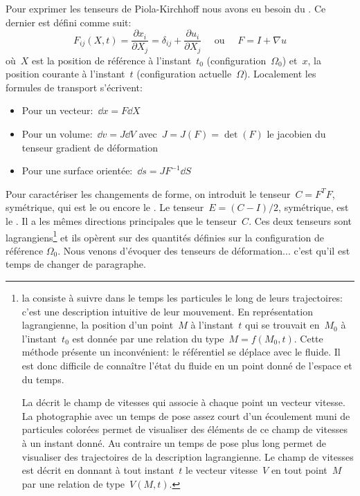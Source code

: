 \medskipvm
Pour exprimer les tenseurs de Piola-Kirchhoff
nous avons eu besoin du . Ce dernier est défini comme suit:
\begin{equation} F_{ij}(X,t) = \dfrac{\partial x_i}{\partial X_j} = \delta_{ij} + \frac{\partial u_i}{\partial X_j}
\quad \text{ ou } \quad F = I + \nabla u\end{equation}
où~$X$ est la position de référence à l'instant~$t_0$ (configuration~$\Omega_0$) et~$x$, la position
courante à l'instant~$t$ (configuration actuelle~$\Omega$).
\medskipvm
Localement les formules de transport s'écrivent:
\begin{itemize}
  \item Pour un vecteur:~$\dd x = F \dd X$
  \item Pour un volume:~$\dd v = J \dd V$ avec~$J= J(F) = \det(F)$ le jacobien du tenseur gradient de déformation
  \item Pour une surface orientée:~$\dd s = J F^{-1} \dd S$
\end{itemize}
\medskipvm
Pour caractériser les changements de forme, on introduit le tenseur~$C = F^TF$, symétrique, qui est le
 ou encore le .
\medskipvm
Le tenseur~$E = (C-I)/2$, symétrique, est le .
Il a les mêmes directions principales que le tenseur~$C$.
\medskipvm
Ces deux tenseurs sont lagrangiens\footnote{la  consiste à suivre dans le temps les particules le long de leurs trajectoires: c'est une description intuitive de leur mouvement.
En représentation lagrangienne, la position d'un point~$M$ à l'instant~$t$ qui se trouvait en~$M_0$ à
l'instant~$t_0$ est donnée par une relation du type~$M = f(M_0,t)$.
Cette méthode présente un inconvénient: le référentiel se déplace avec le fluide.
Il est donc difficile de connaître l'état du fluide en un point donné de l'espace et du temps.

\medskip
La  décrit le champ de vitesses qui associe à chaque point un
vecteur vitesse.
La photographie avec un temps de pose assez court d'un écoulement muni de particules colorées permet
de visualiser des éléments de ce champ de vitesses à un instant donné.
Au contraire un temps de pose plus long permet de visualiser des trajectoires de la description lagrangienne.
Le champ de vitesses est décrit en donnant à tout instant~$t$ le vecteur vitesse~$V$ en tout point~$M$
par une relation de type~$V(M,t)$.
} et ils opèrent sur des quantités définies sur la configuration de référence
$\Omega_0$.
\medskipvm
Nous venons d'évoquer des tenseurs de déformation... c'est qu'il est temps de changer de
paragraphe.



